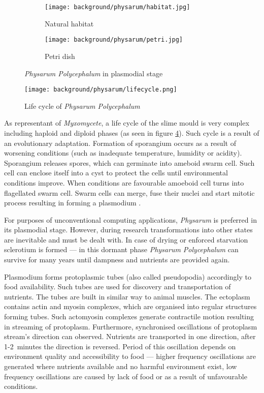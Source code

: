 \begin{figure}
  \centering
  \begin{subfigure}{0.45\textwidth}
    \centering
    \texttt{[image: background/physarum/habitat.jpg]}
    \caption{Natural habitat \cite{TODO}}
    \label{figure:bp_habitat}
  \end{subfigure}
  \begin{subfigure}{0.45\textwidth}
    \centering
    \texttt{[image: background/physarum/petri.jpg]}
    \caption{Petri dish}
    \label{figure:bp_petri}
  \end{subfigure}
  \caption{\textit{Physarum Polycephalum} in plasmodial stage}
\end{figure}

\begin{figure}
  \centering
  \texttt{[image: background/physarum/lifecycle.png]}
  \caption{Life cycle of \textit{Physarum Polycephalum} \cite{TODO}}
  \label{figure:bp_lifecycle}
\end{figure}

As representant of \textit{Myxomycete}, a life cycle of the slime mould is very complex including haploid and diploid phases (as seen in figure \ref{figure:bp_lifecycle}). Such cycle is a result of an evolutionary adaptation. Formation of sporangium occurs as a result of worsening conditions (such as inadequate temperature, humidity or acidity). Sporangium releases spores, which can germinate into ameboid swarm cell. Such cell can enclose itself into a cyst to protect the cells until environmental conditions improve. When conditions are favourable amoeboid cell turns into flagellated swarm cell. Swarm cells can merge, fuse their nuclei and start mitotic process resulting in forming a plasmodium \cite{jones2015pattern}.

For purposes of unconventional computing applications, \textit{Physarum} is preferred in its plasmodial stage. However, during research transformations into other states are inevitable and must be dealt with. In case of drying or enforced starvation sclerotium is formed --- in this dormant phase \textit{Physarum Polycephalum} can survive for many years until dampness and nutrients are provided again.

Plasmodium forms protoplasmic tubes (also called pseudopodia) accordingly to food availability. Such tubes are used for discovery and transportation of nutrients. The tubes are built in similar way to animal muscles. The ectoplasm contains actin and myosin complexes, which are organised into regular structures forming tubes. Such actomyosin complexes generate contractile motion resulting in streaming of protoplasm. Furthermore, synchronised oscillations of protoplasm stream's direction can observed. Nutrients are transported in one direction, after 1-2~minutes the direction is reversed. Period of this oscillation depends on environment quality and accessibility to food \cite{wohlfarth1979oscillatory} --- higher frequency oscillations are generated where nutrients available and no harmful environment exist, low frequency oscillations are caused by lack of food or as a result of unfavourable conditions. 


